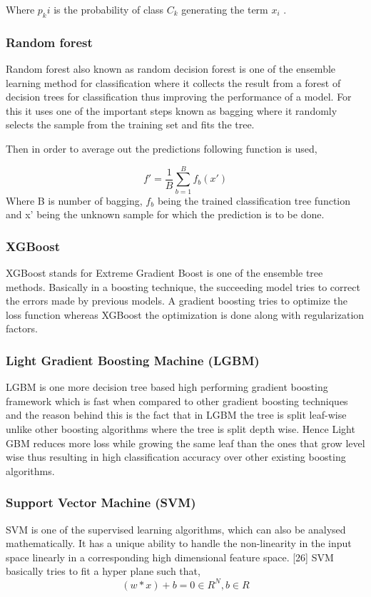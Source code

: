 \documentclass[12pt]{article}
\begin{document}
Where $p_ki$ is the probability of class $C_k$ generating the term $x_i$ .

\subsubsection{Random forest}
Random forest also known as random decision forest is one of the ensemble learning method for classification where it collects the result from a forest of decision trees for classification thus improving the performance of a model. For this it uses one of the important steps known as bagging where it randomly selects the sample from the training set and fits the tree.

	Then in order to average out the predictions following function is used,
	
\begin{equation} 
 f'= \frac{1}{B} \sum^{B}_{b=1}f_b(x')                   
\end{equation}
Where B is number of bagging, $f_b$ being the trained classification tree function and x' being the unknown sample for which the prediction is to be done.

\subsubsection{XGBoost}
XGBoost stands for Extreme Gradient Boost is one of the ensemble tree methods.  Basically in a boosting technique, the succeeding model tries to correct the errors made by previous models. A gradient boosting tries to optimize the loss function whereas XGBoost the optimization is done along with regularization factors.

\subsubsection{Light Gradient Boosting Machine (LGBM)}
LGBM is one more decision tree based high performing gradient boosting framework which is fast when compared to other gradient boosting techniques and the reason behind this is the fact that in LGBM the tree is split leaf-wise unlike other boosting algorithms where the tree is split depth wise. Hence Light GBM reduces more loss while growing the same leaf than the ones that grow level wise thus resulting in high classification accuracy over other existing boosting algorithms.

\subsubsection{Support Vector Machine (SVM)}
SVM is one of the supervised learning algorithms, which can also be analysed mathematically.  It has a unique ability to handle the non-linearity in the input space linearly in a corresponding high dimensional feature space. [26]
	SVM basically tries to fit a hyper plane such that, 
\begin{equation} 
 (w*x)+b=0 \in R^N, b \in R 
\end{equation}
\end{document}
